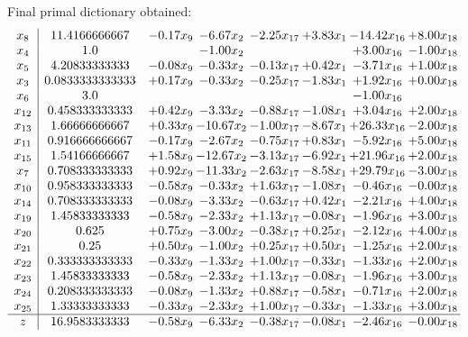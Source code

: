 \documentclass[8pt]{article}
\begin{document}
 Final primal dictionary obtained: 
\[\begin{array}{c| c c@{\hskip 2pt} c@{\hskip 2pt} c@{\hskip 2pt} c@{\hskip 2pt} c@{\hskip 2pt} c@{\hskip 2pt} }
 x_{8}   &  11.4166666667 & -0.17 x_{9} & -6.67 x_{2} & -2.25 x_{17} & +  3.83 x_{1} & -14.42 x_{16} & +  8.00 x_{18}\\
 x_{4}   &  1.0  &   & -1.00 x_{2} &    &   & +  3.00 x_{16} & -1.00 x_{18}\\
 x_{5}   &  4.20833333333 & -0.08 x_{9} & -0.33 x_{2} & -0.13 x_{17} & +  0.42 x_{1} & -3.71 x_{16} & +  1.00 x_{18}\\
 x_{3}   &  0.0833333333333 & +  0.17 x_{9} & -0.33 x_{2} & -0.25 x_{17} & -1.83 x_{1} & +  1.92 x_{16} & +  0.00 x_{18}\\
 x_{6}   &  3.0  &    &    &    &   & -1.00 x_{16} &   \\
 x_{12}   &  0.458333333333 & +  0.42 x_{9} & -3.33 x_{2} & -0.88 x_{17} & -1.08 x_{1} & +  3.04 x_{16} & +  2.00 x_{18}\\
 x_{13}   &  1.66666666667 & +  0.33 x_{9} & -10.67 x_{2} & -1.00 x_{17} & -8.67 x_{1} & + 26.33 x_{16} & -2.00 x_{18}\\
 x_{11}   &  0.916666666667 & -0.17 x_{9} & -2.67 x_{2} & -0.75 x_{17} & +  0.83 x_{1} & -5.92 x_{16} & +  5.00 x_{18}\\
 x_{15}   &  1.54166666667 & +  1.58 x_{9} & -12.67 x_{2} & -3.13 x_{17} & -6.92 x_{1} & + 21.96 x_{16} & +  2.00 x_{18}\\
 x_{7}   &  0.708333333333 & +  0.92 x_{9} & -11.33 x_{2} & -2.63 x_{17} & -8.58 x_{1} & + 29.79 x_{16} & -3.00 x_{18}\\
 x_{10}   &  0.958333333333 & -0.58 x_{9} & -0.33 x_{2} & +  1.63 x_{17} & -1.08 x_{1} & -0.46 x_{16} & -0.00 x_{18}\\
 x_{14}   &  0.708333333333 & -0.08 x_{9} & -3.33 x_{2} & -0.63 x_{17} & +  0.42 x_{1} & -2.21 x_{16} & +  4.00 x_{18}\\
 x_{19}   &  1.45833333333 & -0.58 x_{9} & -2.33 x_{2} & +  1.13 x_{17} & -0.08 x_{1} & -1.96 x_{16} & +  3.00 x_{18}\\
 x_{20}   &  0.625 & +  0.75 x_{9} & -3.00 x_{2} & -0.38 x_{17} & +  0.25 x_{1} & -2.12 x_{16} & +  4.00 x_{18}\\
 x_{21}   &  0.25 & +  0.50 x_{9} & -1.00 x_{2} & +  0.25 x_{17} & +  0.50 x_{1} & -1.25 x_{16} & +  2.00 x_{18}\\
 x_{22}   &  0.333333333333 & -0.33 x_{9} & -1.33 x_{2} & +  1.00 x_{17} & -0.33 x_{1} & -1.33 x_{16} & +  2.00 x_{18}\\
 x_{23}   &  1.45833333333 & -0.58 x_{9} & -2.33 x_{2} & +  1.13 x_{17} & -0.08 x_{1} & -1.96 x_{16} & +  3.00 x_{18}\\
 x_{24}   &  0.208333333333 & -0.08 x_{9} & -1.33 x_{2} & +  0.88 x_{17} & -0.58 x_{1} & -0.71 x_{16} & +  2.00 x_{18}\\
 x_{25}   &  1.33333333333 & -0.33 x_{9} & -2.33 x_{2} & +  1.00 x_{17} & -0.33 x_{1} & -1.33 x_{16} & +  3.00 x_{18}\\
\hline
z    &  16.9583333333 & -0.58 x_{9} & -6.33 x_{2} & -0.38 x_{17} & -0.08 x_{1} & -2.46 x_{16} & -0.00 x_{18}\\
\end{array}\]
\end{document}
